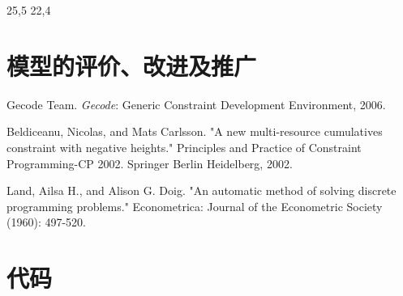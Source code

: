 \documentclass[UTF8]{ctexart}
\begin{document}
25,5
22,4
\section{模型的评价、改进及推广}






\begin{thebibliography}{1}  %
 Gecode Team.  \textit{Gecode}: Generic Constraint
  Development Environment, 2006. 
  
Beldiceanu, Nicolas, and Mats Carlsson. "A new multi-resource cumulatives constraint with negative heights." Principles and Practice of Constraint Programming-CP 2002. Springer Berlin Heidelberg, 2002. 

 Land, Ailsa H., and Alison G. Doig. "An automatic method of solving discrete programming problems." Econometrica: Journal of the Econometric Society (1960): 497-520.


\end{thebibliography}

\appendix
\section{代码}
\end{document}
